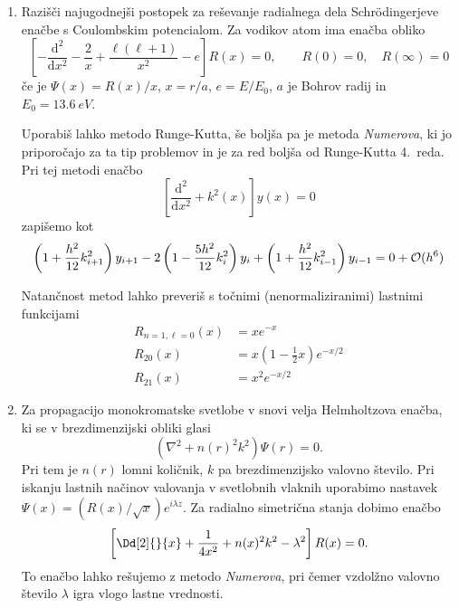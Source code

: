 
\begin{enumerate}

    \item Razišči najugodnejši postopek za reševanje radialnega dela
      Schrödingerjeve enačbe s Coulombskim potencialom. Za vodikov atom
      ima enačba obliko
    \begin{equation*}
    \left[-\frac{\mathrm{d}^2}{\mathrm{d}x^2}-\frac{2}{x}+\frac{\ell(\ell+1)}{x^2}-e\right]R(x)=0,
    \qquad R(0)=0,\quad R(\infty)=0
    \end{equation*}
    če je $\Psi(x)=R(x)/x$, $x=r/a$, $e=E/E_0$, $a$ je Bohrov radij in
    $E_0=\SI{13.6}{eV}$.

    Uporabiš lahko metodo Runge-Kutta, še boljša pa je metoda {\sl
      Numerova}, ki jo priporočajo za ta tip problemov in je za red boljša
    od Runge-Kutta 4.~reda. Pri tej metodi enačbo
    \begin{equation*}
    \left[\frac{\mathrm{d}^2}{\mathrm{d}x^2}+k^2(x)\right]y(x)=0
    \end{equation*}
    zapišemo kot
    \begin{equation*}
    \left(1+\frac{h^2}{12}k^2_{i+1}\right)y_{i+1}-
    2\left(1-\frac{5h^2}{12}k^2_i\right)y_i+
    \left(1+\frac{h^2}{12}k^2_{i-1}\right)y_{i-1}=0+{\cal O}(h^6)
    \end{equation*}

    Natančnost metod lahko preveriš s točnimi (nenormaliziranimi)
    lastnimi funkcijami
    \begin{align*}
    R_{n=1,\ell=0}(x)&=xe^{-x}\\
    R_{20}(x)&=x(1-\tfrac{1}{2}x)e^{-x/2}\\
    R_{21}(x)&=x^2e^{-x/2}
    \end{align*}

    \item Za propagacijo monokromatske svetlobe v snovi velja Helmholtzova
      enačba, ki se v brezdimenzijski obliki glasi
      \begin{equation*}
        (\nabla^2+n({r})^2k^2)\Psi({r})=0.
      \end{equation*}
    Pri tem je $n({r})$ lomni količnik, $k$ pa brezdimenzijsko valovno
    število. Pri iskanju lastnih načinov valovanja v svetlobnih vlaknih
    uporabimo nastavek $\Psi(x)=(R(x)/\sqrt{x}) e^{i \lambda z}$. Za
    radialno simetrična stanja dobimo enačbo
      \begin{equation*}
        \left[\Dd[2]{}{x}+\frac{1}{4x^2}+n(x)^2 k^2-\lambda^2\right]R(x)=0.
      \end{equation*}
    To enačbo lahko rešujemo z metodo {\sl Numerova}, pri čemer vzdolžno valovno
    število $\lambda$ igra vlogo lastne vrednosti.


\end{enumerate}
